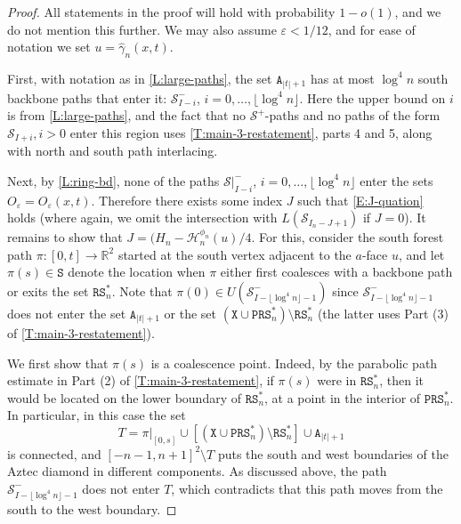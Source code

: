 \documentclass[11pt,twoside]{amsart}
\theoremstyle{plain}
\numberwithin{quest}{section}
\theoremstyle{remark}
\numberwithin{rem}{section}
\theoremstyle{definition}
\newcommand{\eps}{\varepsilon}
\newcommand{\R}{\mathbb{R}}
\newcommand{\cS}{\mathcal{S}}
\newcommand{\cH}{\mathcal{H}}
\renewcommand{\tt}[1]{{\mathtt{#1}}}
\begin{document}
	\begin{proof}
		All statements in the proof will hold with probability $1 - o(1)$, and we do not mention this further. We may also assume $\eps < 1/12$, and for ease of notation we set $u = \hat \gamma_n(x, t)$. 
		
	First, with notation as in \cref{L:large-paths}, the set $\tt{A}_{|t| + 1}$ has at most $\log^4 n$ south backbone paths that enter it: $\cS_{I-i}^-$, $i = 0, \dots, \lfloor \log^4 n \rfloor$. Here the upper bound on $i$ is from \cref{L:large-paths}, and the fact that no $\cS^+$-paths and no paths of the form $\cS_{I + i}, i > 0$ enter this region uses \cref{T:main-3-restatement}, parts 4 and 5, along with north and south path interlacing.
	
Next, by \cref{L:ring-bd}, none of the paths $\cS|_{I-i}^-$, $i = 0, \dots, \lfloor \log^4 n \rfloor$ enter the sets $O_\eps = O_\eps(x, t)$. Therefore there exists some index $J$ such that \eqref{E:J-quation} holds (where again, we omit the intersection with $L(\cS_{I_n - J+1})$ if $J = 0$). It remains to show that $J = (H_n - \cH_n^{\phi_n}(u)/4$. For this, consider the south forest path $\pi:[0, t] \to \R^2$ started at the south vertex adjacent to the $a$-face $u$, and let $\pi(s) \in \tt{S}$ denote the location when $\pi$ either first coalesces with a backbone path or exits the set $\tt{RS}_n^*$. Note that $\pi(0) \in U(\cS_{I- \lfloor \log^4 n \rfloor - 1}^-)$ since $\cS_{I- \lfloor \log^4 n \rfloor - 1}^-$ does not enter the set $\tt{A}_{|t| + 1}$ or the set $(\tt{X} \cup \tt{PRS}^*_n)\setminus \tt{RS}^*_n$ (the latter uses Part (3) of \cref{T:main-3-restatement}).

We first show that $\pi(s)$ is a coalescence point. Indeed, by the parabolic path estimate in Part (2) of \cref{T:main-3-restatement}, if $\pi(s)$ were in $\tt{RS}_n^*$, then it would be located on the lower boundary of $\tt{RS}_n^*$, at a point in the interior of $\tt{PRS}^*_n$. In particular, in this case the set
$$
T = \pi|_{[0, s]} \cup [(\tt{X} \cup \tt{PRS}^*_n)\setminus \tt{RS}^*_n] \cup \tt{A}_{|t| + 1}
$$
is connected, and $[-n - 1, n + 1]^2 \setminus T$ puts the south and west boundaries of the Aztec diamond in different components. As discussed above, the path  $\cS_{I- \lfloor \log^4 n \rfloor - 1}^-$ does not enter $T$, which contradicts that this path moves from the south to the west boundary.


\end{proof}
\end{document}
